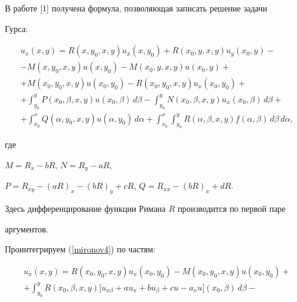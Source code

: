В  работе [1] получена формула, позволяющая записать решение задачи


Гурса:


\begin{multline}\label{mironov4}


u_{x}(x,y)=R(x,y_{0},x,y)u_{x}(x,y_{0})


+R(x_{0},y,x,y)u_{y}(x_{0},y)-


\\-M(x,y_{0},x,y)u(x,y_{0})


-M(x_{0},y,x,y)u(x_{0},y)+\\


+M(x_{0},y_{0},x,y)u(x_{0},y_{0})-R(x_{0},y_{0},x,y)u_{x}(x_{0},y_{0})+\\


+\int_{y_{0}}^{y} P(x_{0},\beta,x,y)u(x_{0},\beta)\,d\beta


-\int_{y_{0}}^{y} N(x_{0},\beta,x,y)u_{x}(x_{0},\beta)\,d\beta+\\


+\int_{x_{0}}^{x} Q(\alpha,y_{0},x,y)u(\alpha,y_{0})\,d\alpha


+\int_{x_{0}}^{x}  \int_{y_{0}}^{y}


R(\alpha,\beta,x,y)f(\alpha,\beta)\, d\beta \,d\alpha,


\end{multline}


где


$M=R_{x}-bR$, $N=R_{y}-aR$,


$P=R_{xy}-(aR)_{x}-(bR)_{y}+cR$, $Q=R_{xx}-(bR)_{x}+dR$.


Здесь дифференцирование функции Римана $R$ производится по первой паре


аргументов.





Проинтегрируем (\ref{mironov4}) по частям:


\begin{multline*}


u_{x}(x,y)=R(x_{0},y_{0},x,y)u_{x}(x_{0},y_{0})


-M(x_{0},y_{0},x,y)u(x_{0},y_{0})+\\


+\int_{y_{0}}^{y} R(x_{0},\beta,x,y)\bigl[u_{x\beta}+au_{x}+bu_{\beta}+cu-a_{x}u\bigr](x_{0},\beta)\,d\beta-


\end{multline*}


